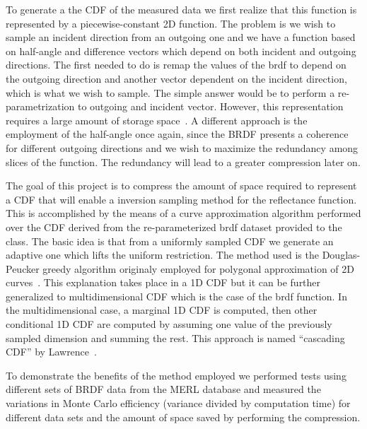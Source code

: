 \documentclass[conference]{acmsiggraph}
\begin{document}
To generate a the CDF of the measured data we first realize that this function is represented by a piecewise-constant 2D function. The problem is we wish to sample an incident direction from an outgoing one and we have a function based on half-angle and difference vectors which depend on both incident and outgoing directions. The first needed to do is remap the values of the brdf to depend on the outgoing direction and another vector dependent on the incident direction, which is what we wish to sample. The simple answer would be to perform a re-parametrization to outgoing and incident vector. However, this representation requires a large amount of storage space~\cite{Lawrence:2004:EBI}. A different approach is the employment of the half-angle once again, since the BRDF presents a coherence for different outgoing directions and we wish to maximize the redundancy among slices of the function. The redundancy will lead to a greater compression later on.  

The goal of this project is to compress the amount of space required to represent a CDF that will enable a inversion sampling method for the reflectance function. This is accomplished by the means of a curve approximation algorithm performed over the CDF derived from the re-parameterized brdf dataset provided to the class.  The basic idea is that from a uniformly sampled CDF we generate an adaptive one which lifts the uniform restriction. The method used is the Douglas-Peucker greedy algorithm originaly employed for polygonal approximation of 2D curves~\cite{Douglas-Peucker:1973:AFT}.  This explanation takes place in a 1D CDF but it can be further generalized to multidimensional CDF which is the case of the brdf function. In the multidimensional case, a marginal 1D CDF is computed, then other conditional 1D CDF are computed by assuming one value of the previously sampled dimension and summing the rest. This approach is named “cascading CDF” by Lawrence~\cite{Lawrence:2005:ANC}.  

To demonstrate the benefits of the method employed we performed tests using different sets of BRDF data from the MERL database and measured the variations in Monte Carlo efficiency (variance divided by computation time) for different data sets and the amount of space saved by performing the compression.
\end{document}
